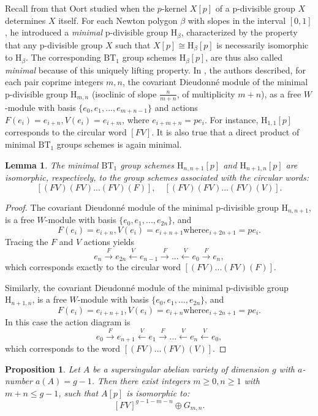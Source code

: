 \documentclass[a4paper,12pt,twoside]{report}
\newtheorem{proposition}[theorem]{Proposition}
\newtheorem{lemma}[theorem]{Lemma}
\newcommand{\HH}{\mathrm{H}}
\newcommand{\BT}{\mathrm{BT}}
\begin{document}
Recall from \cite{Oo4} that Oort studied when the $p$-kernel $X[p]$ of a p-divisible group $X$ 
determines $X$ itself. 
For each Newton polygon \(\beta\) with slopes in the interval \([0,1]\), 
he introduced a \emph{minimal} p-divisible group \(\HH_{\beta}\), 
characterized by the property that any p-divisible group $X$ such that $X[p]\cong \HH_{\beta}[p]$ is 
necessarily isomorphic to $\HH_{\beta}$. 
The corresponding \(\BT_1\) group schemes \(\HH_{\beta}[p]\), 
are thus also called \emph{minimal} because of this uniquely lifting property. 
In \cite[5.3]{Oo5}, the authors described, for each pair coprime integers \(m,n\), 
the covariant Dieudonné module of the minimal p-divisible group $\HH_{m,n}$ 
(isoclinic of slope \(\frac{n}{m+n}\), of multiplicity $m+n$), 
as a free $W$-module with basis $\{e_0,e_1,...,e_{m+n-1}\}$ 
and actions $F(e_i)=e_{i+n}, V(e_i)=e_{i+m}$, where $e_{i+m+n}=pe_i$. 
For instance, $\HH_{1,1}[p]$ corresponds to the circular word $[FV]$. 
It is also true that a direct product of minimal $\BT_1$ groups schemes is again minimal. 

\begin{lemma}\label{minimalnn+1}
    The minimal $\BT_1$ group schemes $\HH_{n,n+1}[p]$ and $\HH_{n+1,n}[p]$ 
    are isomorphic, respectively, to the group schemes associated with the circular words:
    \[[(FV)(FV)...(FV)(F)], \quad [(FV)(FV)...(FV)(V)]. \]
\end{lemma}

\begin{proof}
    The covariant Dieudonné module of the minimal p-divisible group $\HH_{n,n+1}$, 
    is a free $W$-module with basis $\{e_0,e_1,...,e_{2n}\}$, 
    and \[F(e_i)=e_{i+n}, V(e_i)=e_{i+n+1} \text{where} e_{i+2n+1}=pe_i.\]
    Tracing the $F$ and $V$ actions yields
    \[e_n\xrightarrow{F} e_{2n}\xleftarrow{V}e_{n-1}\xrightarrow{F}...\xleftarrow{V}e_0\xrightarrow{F}e_n,\]
    which corresponds exactly to the circular word \([(FV)...(FV)(F)]\). 

    Similarly, the covariant Dieudonné module of the minimal p-divisible group $\HH_{n+1,n}$, 
    is a free $W$-module with basis $\{e_0,e_1,...,e_{2n}\}$, 
    and \[F(e_i)=e_{i+n+1}, V(e_i)=e_{i+n} \text{where} e_{i+2n+1}=pe_i.\] 
    In this case the action diagram is
    \[e_{0}\xrightarrow{F} e_{n+1}\xleftarrow{V}e_{1}\xrightarrow{F}...\xleftarrow{V}e_n\xleftarrow{V}e_0,\]
    which corresponds to the word \([(FV)...(FV)(V)]\). 
\end{proof}

\begin{proposition}
    Let $A$ be a supersingular abelian variety of dimension $g$ with $a$-number $a(A)=g-1$. 
    Then there exist integers $m\geqslant 0,n\geqslant1$ with $m+n\leqslant g-1$, such that $A[p]$ is isomorphic to: 
    \[[FV]^{g-1-m-n}\oplus G_{m,n}.\]
\end{proposition}
\end{document}
